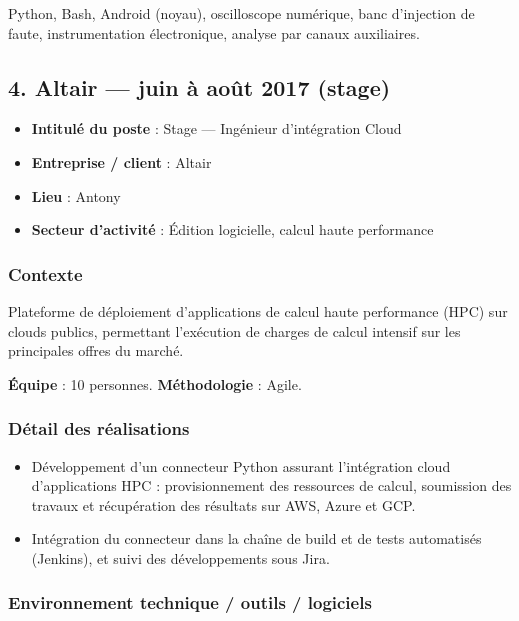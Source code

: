 \documentclass[11pt,a4paper]{article}
\begin{document}
Python, Bash, Android (noyau), oscilloscope numérique, banc d'injection de faute, instrumentation électronique, analyse par canaux auxiliaires.

\subsection{4. Altair --- juin à août 2017 (stage)}

\begin{itemize}
  \item \textbf{Intitulé du poste} : Stage --- Ingénieur d'intégration Cloud
  \item \textbf{Entreprise / client} : Altair
  \item \textbf{Lieu} : Antony
  \item \textbf{Secteur d'activité} : Édition logicielle, calcul haute performance
\end{itemize}

\subsubsection{Contexte}

Plateforme de déploiement d'applications de calcul haute performance (HPC) sur clouds publics, permettant l'exécution de charges de calcul intensif sur les principales offres du marché.

\textbf{Équipe} : 10 personnes. \textbf{Méthodologie} : Agile.

\subsubsection{Détail des réalisations}

\begin{itemize}
  \item Développement d'un connecteur Python assurant l'intégration cloud d'applications HPC : provisionnement des ressources de calcul, soumission des travaux et récupération des résultats sur AWS, Azure et GCP.
  \item Intégration du connecteur dans la chaîne de build et de tests automatisés (Jenkins), et suivi des développements sous Jira.
\end{itemize}

\subsubsection{Environnement technique / outils / logiciels}
\end{document}
